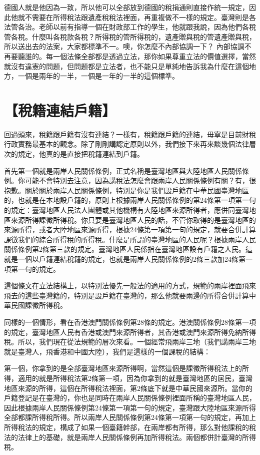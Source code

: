 \documentclass[]{ctexbook}
\begin{document}
德國人就是他因為一致，所以他可以全部放到德國的稅捐通則直接作統一規定，因此他就不需要在所得稅法跟遺產稅稅法裡面，再重複做不一樣的規定。臺灣則是各法管各治。老師以前有指導一個在財政部工作的學生，他就跟我說，因為他們各稅管各稅。什麼叫各稅款各稅？所得稅的管所得稅的，遺產贈與稅的管遺產贈與稅，所以送出去的法案，大家都標準不一。噢，你怎麼不內部協調一下？ 內部協調不再要聽誰的。每一個法條全部都是透過立法，那你如果尊重立法的價值選擇，當然就沒有違憲的問題，但問題都是立法者，也不能只是單純地告訴我為什麼在這個地方，一個是兩年的一半，一個是一年的一半的這個標準。

\hypertarget{ux7a05ux7c4dux9023ux7d50ux6236ux7c4d}{%
\section{【稅籍連結戶籍】}\label{ux7a05ux7c4dux9023ux7d50ux6236ux7c4d}}

回過頭來，稅籍跟戶籍有沒有連結？一樣有，稅籍跟戶籍的連結，毋寧是目前財稅行政實務最基本的觀念。除了剛剛講認定原則以外，我們接下來再來談幾個法律層次的規定，他真的是直接把稅籍連結到戶籍。

首先第一個就是兩岸人民關係條例，正式名稱是臺灣地區與大陸地區人民關係條例。你可能不會特別去注意，因為講稅法怎麼會跟兩岸人民關係條例有關？有，很抱歉。關於關於兩岸人民關係條例，特別是你是我們設戶籍在中華民國臺灣地區的，也就是在本地設戶籍的，原則上根據兩岸人民關係條例的第24條第一項第一句的規定：臺灣地區人民法人團體或其他機構有大陸地區來源所得者，應併同臺灣地區來源所得課徵所得稅。你只要是臺灣地區人民的話，不管你取得的是臺灣地區的來源所得，或者大陸地區來源所得，根據24條第一項第一句的規定，就要合併計算課徵我們的綜合所得稅的所得稅。什麼是所謂的臺灣地區的人民呢？根據兩岸人民關係條例第2條第三款的規定。臺灣地區人民係指在臺灣地區設有戶籍之人民。這就是一個以戶籍連結稅籍的規定，也就是兩岸人民關係條例的2條三款加24條第一項第一句的規定。

這個條文在立法結構上，以特別法優先一般法的適用的方式，規範的兩岸裡面飛來飛去的這些臺灣籍的，特別是設戶籍在臺灣的，那么他就要兩邊的所得合併計算中華民國課徵所得稅。

同樣的一個情形，看在香港澳門關係條例第28條的規定。港澳關係條例28條第一項的規定，臺灣地區人民有香港或澳門來源所得者，其香港或澳門來源所得免納所得稅。所以，我們現在從法規範的層次來看。一個經常飛兩岸三地（我們講兩岸三地就是臺灣人，飛香港和中國大陸），我們是這樣的一個課稅的結構：

第一個，你拿到的是全部臺灣地區來源所得啊，當然這個是課徵所得稅法上的所得，適用的就是所得稅法第2條第一項，因為你拿到的就是臺灣地區的居民，臺灣地區來源的所得，這個在所得稅法裡面，第2條底下就是中華民國來源所。當你的戶籍登記是在臺灣的，你也是同時在兩岸人民關係條例裡面所稱的臺灣地區人民，因此根據兩岸人民關係條例第24條第一項第一句的規定，臺灣跟大陸地區來源所得全部都課所得稅所得。所以兩岸人民關係條例第24條第一項第一句的規定，再加上所得稅法的規定，構成了如果一個臺籍幹部，在兩岸都有所得，那么對他課稅的稅法的法律上的基礎，就是兩岸人民關係條例再加所得稅法。兩個都併計臺灣的所得稅。
\end{document}
